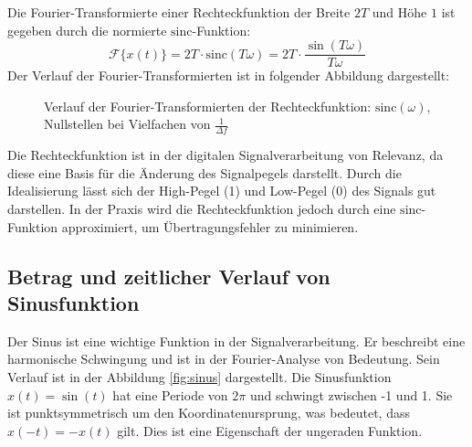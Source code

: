 Die Fourier-Transformierte einer Rechteckfunktion der Breite $2T$ und Höhe $1$ ist gegeben durch die normierte $\mathrm{sinc}$-Funktion:
\[
\mathcal{F}\{x(t)\} = 2T \cdot \mathrm{sinc}(T\omega) = 2T \cdot \frac{\sin(T\omega)}{T\omega}
\]
Der Verlauf der Fourier-Transformierten ist in folgender Abbildung dargestellt:

\begin{figure}[H]
    \centering
    \caption{Verlauf der Fourier-Transformierten der Rechteckfunktion: $\mathrm{sinc}(\omega)$, Nullstellen bei Vielfachen von $\frac{1}{\Delta f}$}
    \label{fig:fourier_rechteck}
\end{figure}

Die Rechteckfunktion ist in der digitalen Signalverarbeitung von Relevanz, da diese eine Basis für die Änderung des Signalpegels darstellt. Durch die Idealisierung lässt sich der High-Pegel (1) und Low-Pegel (0) des Signals gut darstellen. In der Praxis wird die Rechteckfunktion jedoch durch eine $\mathrm{sinc}$-Funktion approximiert, um Übertragungsfehler zu minimieren.

\subsection{Betrag und zeitlicher Verlauf von Sinusfunktion}
Der Sinus ist eine wichtige Funktion in der Signalverarbeitung.
Er beschreibt eine harmonische Schwingung und ist in der Fourier-Analyse von Bedeutung. Sein Verlauf ist in der Abbildung \ref{fig:sinus} dargestellt.
Die Sinusfunktion $x(t) = \sin(t)$ hat eine Periode von $2\pi$ und schwingt zwischen -1 und 1. Sie ist punktsymmetrisch um den Koordinatenursprung, was bedeutet, dass $x(-t) = -x(t)$ gilt. Dies ist eine Eigenschaft der ungeraden Funktion.

